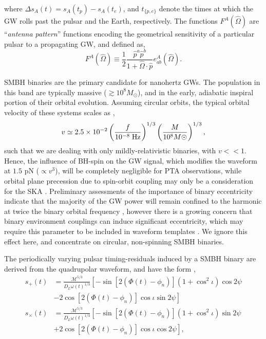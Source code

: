 \documentclass[twocolappendix,tighten]{emulateapj}
\begin{document}
where $\Delta s_A(t) = s_A(t_p) - s_A(t_e)$, and $t_{\{p,e\}}$ denote the times at which the GW rolls past the pulsar and the Earth, respectively. The functions $F^A(\hat\Omega)$ are ``{\it antenna pattern}'' functions encoding the geometrical sensitivity of a particular pulsar to a propagating GW, and defined as,
\begin{equation}
F^A(\hat\Omega)\equiv \frac{1}{2}\frac{\hat{p}^a\hat{p}^b}{1+\hat\Omega\cdot\hat{p}}e^A_{ab}(\hat\Omega).
\end{equation}

SMBH binaries are the primary candidate for nanohertz GWs. The population in this band are typically massive ($\gtrsim 10^8 M_{\odot}$), and in the early, adiabatic inspiral portion of their orbital evolution. Assuming circular orbits, the typical orbital velocity of these systems scales as \citep{corbin-cornish-2010},
\begin{equation}
v \simeq 2.5\times 10^{-2}\left(\frac{f}{10^{-8}\;{\rm Hz}}\right)^{1/3}\left(\frac{M}{10^8 M{\odot}}\right)^{1/3},
\end{equation}
such that we are dealing with only mildly-relativistic binaries, with $v<<1$. Hence, the influence of BH-spin on the GW signal, which modifies the waveform at $1.5$ pN ($\propto v^3$), will be completely negligible for PTA observations, while orbital plane precession due to spin-orbit coupling may only be a consideration for the SKA \citep{sesana-vecchio-measuring-2010,mingarelli2012}. Preliminary assessments of the importance of binary eccentricity indicate that the majority of the GW power will remain confined to the harmonic at twice the binary orbital frequency \citep{sesana-vecchio-measuring-2010}, however there is a growing concern that binary environment couplings can induce significant eccentricity, which may require this parameter to be included in waveform templates \citep{sesana-review-2013-2,tong2013}. We ignore this effect here, and concentrate on circular, non-spinning SMBH binaries.

The periodically varying pulsar timing-residuals induced by a SMBH binary are derived from the quadrupolar waveform, and have the form \citep{wahlquist-1987,corbin-cornish-2010,ellisoptimal2012},
\begin{align} \label{eq:splusscross}
s_+(t) &= \frac{\mathcal{M}^{5/3}}{D_L\omega(t)^{1/3}}\left[-\sin\left[2\left(\Phi(t)-\phi_n\right)\right]\left(1+\cos^2\iota\right)\cos2\psi\right. \nonumber\\
&\left.- 2\cos\left[2\left(\Phi(t)-\phi_n\right)\right]\cos\iota\sin2\psi\right] \nonumber\\
s_\times(t) &= \frac{\mathcal{M}^{5/3}}{D_L\omega(t)^{1/3}}\left[-\sin\left[2\left(\Phi(t)-\phi_n\right)\right]\left(1+\cos^2\iota\right)\sin2\psi\right. \nonumber\\
&\left. + 2\cos\left[2\left(\Phi(t)-\phi_n\right)\right]\cos\iota\cos2\psi\right],
\end{align}
\end{document}
